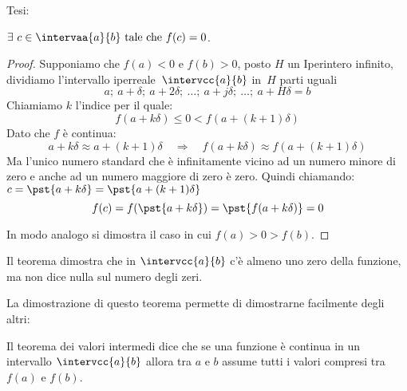 \noindent Tesi: 

\(\exists~c \in \intervaa{a}{b} \text{ tale che } f(c)=0\).


\begin{proof}
Supponiamo che \(f(a)<0\) e \(f(b)>0\), posto \(H\) un Iperintero 
infinito, dividiamo l'intervallo iperreale~\(\intervcc{a}{b}\) in~\(H\) 
parti uguali
\[a;~a+\delta;~a+2\delta;~\dots;~a+j\delta;~\dots;~a+H\delta=b\]
Chiamiamo \(k\) l'indice per il quale:
\[f(a+k\delta) \leqslant 0 < f(a+(k+1)\delta)\]
Dato che \(f\) è continua:
\[a+k\delta \approx a+(k+1)\delta \quad \Rightarrow \quad 
f(a+k\delta) \approx f(a+(k+1)\delta)\] 
Ma l'unico numero standard che è infinitamente vicino ad un numero
minore di zero e anche ad un numero maggiore di zero è zero. 
Quindi chiamando:\(c=\pst{a+k\delta}=\pst{a+(k+1)\delta}\)
\[f(c)=f(\pst{a+k\delta})=\pst{f(a+k\delta)}=0\]

In modo analogo si dimostra il caso in cui \(f(a)>0>f(b)\).
\end{proof}

Il teorema dimostra che in \(\intervcc{a}{b}\) c'è almeno uno zero della 
funzione, ma non dice nulla sul numero degli zeri.

La dimostrazione di questo teorema permette di dimostrarne facilmente degli 
altri: 

\begin{corollario}
Il teorema dei valori intermedi dice che se una funzione è continua in un
intervallo \(\intervcc{a}{b}\) allora tra \(a\) e \(b\) assume tutti i valori 
compresi tra \(f(a)\) e \(f(b)\).
\end{corollario}

